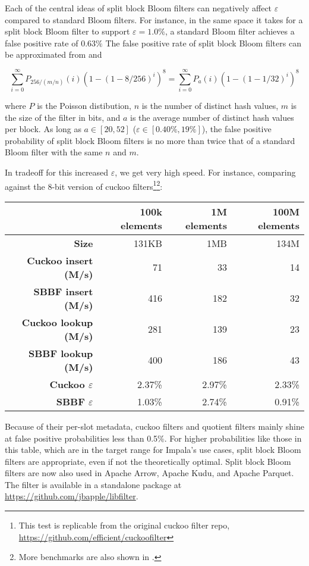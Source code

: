 \documentclass[letterpaper, 11pt]{article}
\begin{document}
Each of the central ideas of split block Bloom filters can negatively affect $\varepsilon$ compared to standard Bloom filters.
For instance, in the same space it takes for a split block Bloom filter to support $\varepsilon = 1.0\%$, a standard Bloom filter achieves a false positive rate of $0.63\%$
The false positive rate of split block Bloom filters can be approximated from \cite[Equation 3]{block} and \cite[Section 2.1]{split-bloom}

\[
\sum_{i=0}^\infty P_{256/(m/n)}(i) (1 - (1-8/256)^i)^8
= \sum_{i=0}^\infty P_a(i) (1 - (1-1/32)^i)^8
\]

where $P$ is the Poisson distibution, $n$ is the number of distinct hash values, $m$ is the size of the filter in bits, and $a$ is the average number of distinct hash values per block.
As long as $a \in [20,52]$ ($\varepsilon \in [0.40\%, 19\%]$), the false positive probability of split block Bloom filters is no more than twice that of a standard Bloom filter with the same $n$ and $m$.

In tradeoff for this increased $\varepsilon$, we get very high speed.
For instance, comparing against the 8-bit version of cuckoo filters\footnote{This test is replicable from the original cuckoo filter repo, \url{https://github.com/efficient/cuckoofilter}}\footnote{More benchmarks are also shown in \cite{lemire-xor-filter,ribbon-filter,bloom-overtakes}.}:

\begin{tabular}{|r|r|r|r|}
  \hline  & {\bf 100k elements} & {\bf 1M elements} & {\bf 100M elements} \\
  \hline {\bf Size} & 131KB & 1MB & 134M \\
  \hline {\bf Cuckoo insert (M/s)} & 71 & 33 & 14 \\
  \hline {\bf SBBF insert (M/s)} & 416 & 182 & 32 \\
  \hline {\bf Cuckoo lookup (M/s)} & 281 & 139 & 23 \\
  \hline {\bf SBBF lookup (M/s)} & 400 & 186 & 43 \\
  \hline {\bf Cuckoo $\varepsilon$} & 2.37\% & 2.97\% & 2.33\% \\
  \hline {\bf SBBF $\varepsilon$} & 1.03\% & 2.74\% & 0.91\% \\
  \hline
\end{tabular}

Because of their per-slot metadata, cuckoo filters and quotient filters mainly shine at false positive probabilities less than 0.5\%.
For higher probabilities like those in this table, which are in the target range for Impala's use cases, split block Bloom filters are appropriate, even if not the theoretically optimal.
Split block Bloom filters are now also used in Apache Arrow, Apache Kudu, and Apache Parquet.
The filter is available in a standalone package at \url{https://github.com/jbapple/libfilter}.
\end{document}
